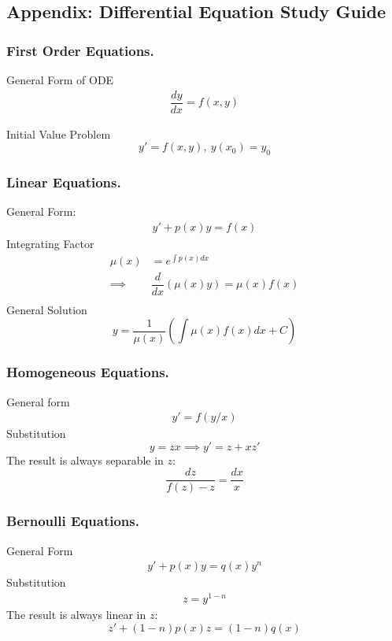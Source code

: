\documentclass[../../main.tex]{subfiles}
\begin{document}
\subsection*{Appendix: Differential Equation Study Guide}
\subsubsection*{First Order Equations.} General Form of ODE
\begin{align*}
\dfrac{dy}{dx}=f(x,y)
\end{align*}

Initial Value Problem
\begin{equation*}
y'=f(x,y),\ y(x_0) = y_0
\end{equation*}

\subsubsection*{Linear Equations.} General Form:
\begin{align*}
y'+p(x)y=f(x)
\end{align*}
Integrating Factor
\begin{align*}
 \mu(x) &= e^{\int p(x)dx}\\
  \implies & \dfrac{d}{dx}\left( \mu(x) y \right) = \mu(x) f(x)\\
\end{align*}
General Solution
\begin{equation*}
y=\frac{1}{\mu(x)}\left( \int \mu(x) f(x) dx + C\right)
\end{equation*}

\subsubsection*{Homogeneous Equations.} General form
\begin{align*}
 y'=f(y/x)
\end{align*}
Substitution
\begin{equation*}
y=zx  \implies y'=z + xz'
\end{equation*}
The result is always separable in $z$: 
\begin{equation*}
\dfrac{dz}{f(z)-z} = \dfrac{dx}{x}
\end{equation*}

\subsubsection*{Bernoulli Equations.} General Form
\begin{align*}
y'+p(x)y=q(x)y^n
\end{align*}
Substitution
\begin{align*}
z = y^{1-n}
\end{align*}
The result is always linear in $z$:
\begin{equation*}
 z' +(1-n)p(x) z = (1-n)q(x)
\end{equation*}
\end{document}
